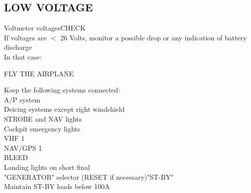 \documentclass{article}
\newcommand{\fly}{\vspace{-1em}\begin{center}\color{Green}FLY THE AIRPLANE\end{center}\vspace{-1em}}
\begin{document}
\begin{multicols*}{2}
\section*{LOW VOLTAGE}
Voltmeter voltages\dotfill CHECK\\
If voltages are $<$ 26 Volts, monitor a possible drop or any indication of battery discharge\\
In that case:
\fly
Keep the following systems connected:\\
\hspace*{6mm} A/P system\\
\hspace*{6mm} Deicing systems except right windshield\\
\hspace*{6mm} STROBE and NAV lights\\
\hspace*{6mm} Cockpit emergency lights\\
\hspace*{6mm} VHF 1\\
\hspace*{6mm} NAV/GPS 1\\
\hspace*{6mm} BLEED\\
\hspace*{6mm} Landing lights on short final\\
"GENERATOR" selector (RESET if necessary)\dotfill "ST-BY"\\
Maintain ST-BY loads below 100A
\vfill\null

\end{multicols*}
\end{document}
